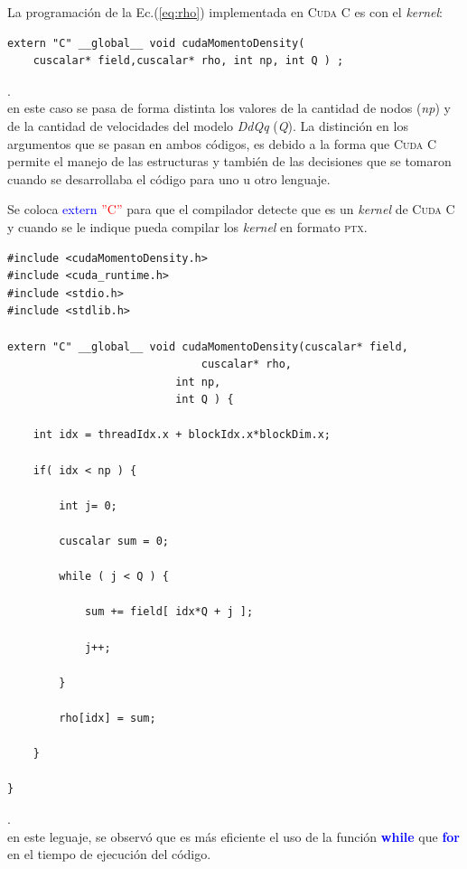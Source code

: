 La programación de la Ec.(\ref{eq:rho}) implementada en \textsc{Cuda C} es con el \textit{kernel}:

{\footnotesize
	\begin{frame}{}
		\begin{lstlisting}
extern "C" __global__ void cudaMomentoDensity(
	cuscalar* field,cuscalar* rho, int np, int Q ) ; 
		\end{lstlisting}
		
	\end{frame}
}.
\\
en este caso se pasa de forma distinta los valores de la cantidad de nodos (\textit{np}) y de la cantidad de velocidades del modelo \textit{DdQq} (\textit{Q}). La distinción en los argumentos que se pasan en ambos códigos, es debido a la forma que \textsc{Cuda C} permite el manejo de las estructuras y también de las decisiones que se tomaron cuando se desarrollaba el código para uno u otro lenguaje.

Se coloca \textcolor{blue}{extern} \textcolor{red}{''C''} para que el compilador detecte que es un \textit{kernel} de \textsc{Cuda C} y cuando se le indique pueda compilar los \textit{kernel} en formato \textsc{ptx}.

{\footnotesize
	\begin{frame}{}
		\begin{lstlisting}[frame=single]
#include <cudaMomentoDensity.h>
#include <cuda_runtime.h>
#include <stdio.h>
#include <stdlib.h>

extern "C" __global__ void cudaMomentoDensity(cuscalar* field,
				              cuscalar* rho,
					      int np,
					      int Q ) {
							
	int idx = threadIdx.x + blockIdx.x*blockDim.x;	
	
	if( idx < np ) {	
	
		int j= 0;		
	
		cuscalar sum = 0;		
	
		while ( j < Q ) {		
	
			sum += field[ idx*Q + j ];			
	
			j++;			
	
		}				
	
		rho[idx] = sum;	
	
	}
	
}		
		\end{lstlisting}
		
	\end{frame}
}.
\\
en este leguaje, se observó que es más eficiente el uso de la función \textcolor{blue}{\textbf{while}} que \textcolor{blue}{\textbf{for}} en el tiempo de ejecución del código.


